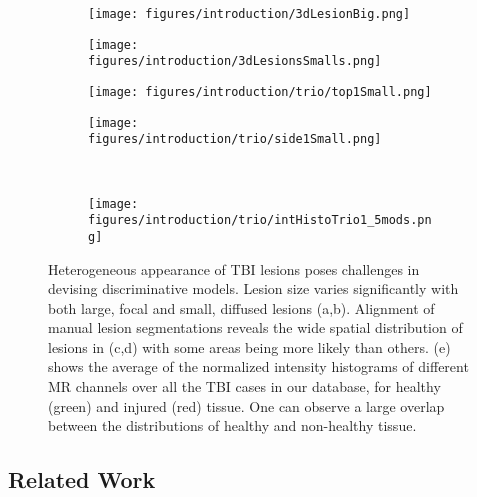 \documentclass[preprint,authoryear,12pt]{elsarticle}
\begin{document}
\begin{figure}[h] 
\centering
\begin{subfigure}[b]{0.225\textwidth}
	\centering
	\texttt{[image: figures/introduction/3dLesionBig.png]}
	\caption{}
	\label{fig:3dLesionBig}
\end{subfigure}
\begin{subfigure}[b]{0.225\textwidth}
	\centering
	\texttt{[image: figures/introduction/3dLesionsSmalls.png]}
	\caption{}
	\label{fig:3dLesionSmalls}
\end{subfigure}
\begin{subfigure}[b]{0.225\textwidth}
	\centering
	\texttt{[image: figures/introduction/trio/top1Small.png]}
	\caption{}
	\label{fig:spatialMap}
\end{subfigure}
\begin{subfigure}[b]{0.22\textwidth}
	\centering
	\texttt{[image: figures/introduction/trio/side1Small.png]}
	\caption{}
	\label{fig:spatialMapSide}
\end{subfigure}
\\[1ex] \centering
\begin{subfigure}[b]{1.0\textwidth}
\centering
\texttt{[image: figures/introduction/trio/intHistoTrio1\_5mods.png]}
	\caption{}
	\label{fig:histInt}
\end{subfigure}

\caption{Heterogeneous appearance of TBI lesions poses challenges in devising discriminative models. Lesion size varies significantly with both large, focal and small, diffused lesions (a,b). Alignment of manual lesion segmentations reveals the wide spatial distribution of lesions in (c,d) with some areas being more likely than others. (e) shows the average of the normalized intensity histograms of different MR channels over all the TBI cases in our database, for healthy (green) and injured (red) tissue. One can observe a large overlap between the distributions of healthy and non-healthy tissue.}
\label{fig:tbiChallenges}
\end{figure} 
\subsection{Related Work}
\end{document}
